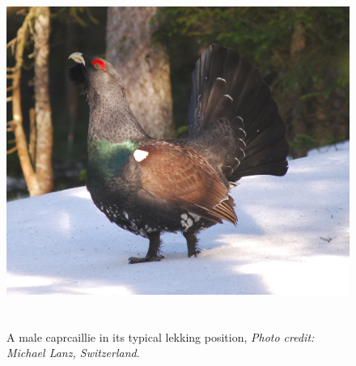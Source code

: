 \begin{figure}
\centering
\includegraphics[width=5in,height=4.21in]{Ch15-searchencounter/figs/capercaillie_lanz.jpg}
\label{searchencounter.fig.capercaillie}
\caption{A male caprcaillie in its typical lekking position,
{\it Photo credit: Michael Lanz, Switzerland}.
}
\end{figure}


